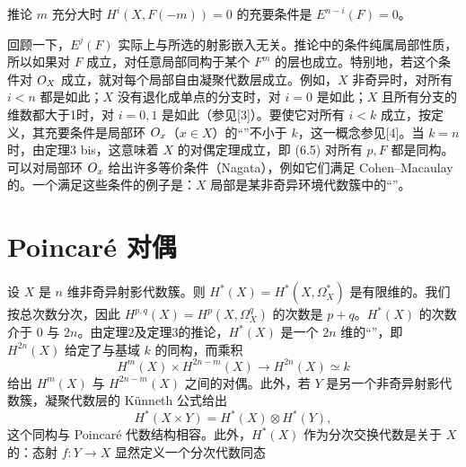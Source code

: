 \begin{statement}{推论}
$m$ 充分大时 $H^i(X,F(-m))=0$ 的充要条件是 $E^{n-i}(F)=0$。
\end{statement}
回顾一下，$E^j(F)$ 实际上与所选的射影嵌入无关。推论中的条件纯属局部性质，所以如果对 $F$ 成立，对任意局部同构于某个 $F^m$ 的层也成立。特别地，若这个条件对 $O_X$ 成立，就对每个局部自由凝聚代数层成立。例如，$X$ 非奇异时，对所有 $i<n$ 都是如此；$X$ 没有退化成单点的分支时，对 $i=0$ 是如此；$X$ 且所有分支的维数都大于1时，对 $i=0,1$ 是如此（参见[3]）。要使它对所有 $i<k$ 成立，按定义，其充要条件是局部环 $O_x$（$x\in X$）的“”不小于 $k$，这一概念参见[4]。当 $k=n$ 时，由定理3 bis，这意味着 $X$ 的对偶定理成立，即 (6.5) 对所有 $p,F$ 都是同构。可以对局部环 $O_x$ 给出许多等价条件（Nagata），例如它们满足 Cohen--Macaulay 的。一个满足这些条件的例子是：$X$ 局部是某非奇异环境代数簇中的“”。

\section{Poincaré 对偶}
设 $X$ 是 $n$ 维非奇异射影代数簇。则 $H^*(X)=H^*(X,\Omega_X^*)$ 是有限维的。我们按总次数分次，因此 $H^{p,q}(X)=H^p(X,\Omega_X^q)$ 的次数是 $p+q$。$H^*(X)$ 的次数介于 $0$ 与 $2n$。由定理2及定理3的推论，$H^*(X)$ 是一个 $2n$ 维的“”，即 $H^{2n}(X)$ 给定了与基域 $k$ 的同构，而乘积
\[
H^m(X)\times H^{2n-m}(X)\longrightarrow H^{2n}(X)\simeq k
\]
给出 $H^m(X)$ 与 $H^{2n-m}(X)$ 之间的对偶。此外，若 $Y$ 是另一个非奇异射影代数簇，凝聚代数层的 Künneth 公式给出
\begin{equation}
H^*(X\times Y)=H^*(X)\otimes H^*(Y),\tag{7.1}
\end{equation}
这个同构与 Poincaré 代数结构相容。此外，$H^*(X)$ 作为分次交换代数是关于 $X$ 的：态射 $f:Y\to X$ 显然定义一个分次代数同态

